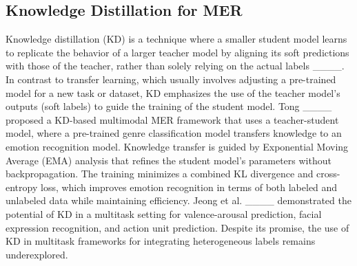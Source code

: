 \subsection{Knowledge Distillation for MER}
Knowledge distillation (KD) is a technique where a smaller student model learns to replicate the behavior of a larger teacher model by aligning its soft predictions with those of the teacher, rather than solely relying on the actual labels ____. In contrast to transfer learning, which usually involves adjusting a pre-trained model for a new task or dataset, KD emphasizes the use of the teacher model's outputs (soft labels) to guide the training of the student model.
Tong ____ proposed a KD-based multimodal MER framework that uses a teacher-student model, where a pre-trained genre classification model transfers knowledge to an emotion recognition model. Knowledge transfer is guided by Exponential Moving Average (EMA) analysis that refines the student model’s parameters without backpropagation. The training minimizes a combined KL divergence and cross-entropy loss, which improves emotion recognition in terms of both labeled and unlabeled data while maintaining efficiency. 
Jeong et al. ____ demonstrated the potential of KD in a multitask setting for valence-arousal prediction, facial expression recognition, and action unit prediction. Despite its promise, the use of KD in multitask frameworks for integrating heterogeneous labels remains underexplored.


